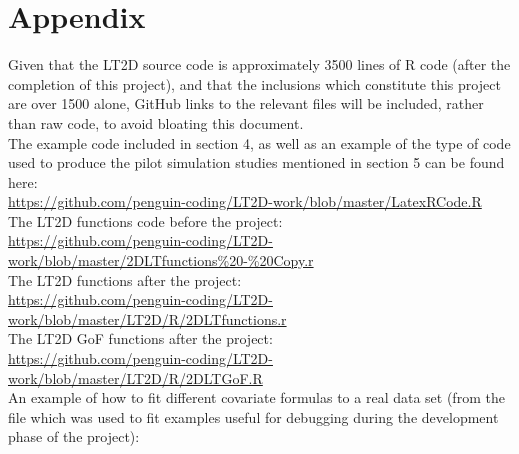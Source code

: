 \documentclass[11pt]{article}
\begin{document}
\section{Appendix}

Given that the LT2D source code is approximately 3500 lines of R code (after the completion of this project), and that the inclusions which constitute this project are over 1500 alone, GitHub links to the relevant files will be included, rather than raw code, to avoid bloating this document.\\

The example code included in section 4, as well as an example of the type of code used to produce the pilot simulation studies mentioned in section 5 can be found here: 
\\
\url{https://github.com/penguin-coding/LT2D-work/blob/master/LatexRCode.R}\\

The LT2D functions code before the project:
\\\url{https://github.com/penguin-coding/LT2D-work/blob/master/2DLTfunctions\%20-\%20Copy.r}\\

The LT2D functions after the project:\\\url{
https://github.com/penguin-coding/LT2D-work/blob/master/LT2D/R/2DLTfunctions.r}\\

The LT2D GoF functions after the project:\\
\url{https://github.com/penguin-coding/LT2D-work/blob/master/LT2D/R/2DLTGoF.R}\\

An example of how to fit different covariate formulas to a real data set (from the file which was used to fit examples useful for debugging during the development phase of the project):\\
\end{document}

